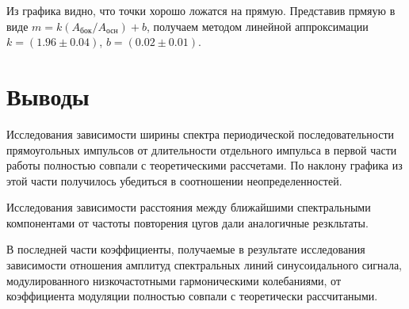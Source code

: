 \documentclass[12pt,a4paper]{scrartcl}
\begin{document}
	 Из графика видно, что точки хорошо ложатся на прямую. Представив прмяую в виде $m = k(A_{\text{бок}} / A_{\text{осн}}) + b$, получаем методом линейной аппроксимации $k = (1.96 \pm 0.04)$, $b = (0.02 \pm 0.01)$.
	
	\section{Выводы}
	
	Исследования зависимости ширины спектра периодической последовательности прямоугольных импульсов от длительности отдельного импульса в первой части работы полностью совпали с теоретическими рассчетами. По наклону графика из этой части получилось убедиться в соотношении неопределенностей.
	
	Исследования зависимости расстояния между ближайшими спектральными компонентами от частоты повторения цугов дали аналогичные резкльтаты.
	
	В последней части коэффициенты, получаемые в результате исследования зависимости отношения амплитуд спектральных линий синусоидального сигнала, модулированного низкочастотными гармоническими колебаниями, от коэффициента модуляции полностью совпали с теоретически рассчитаными.
	
\end{document}

